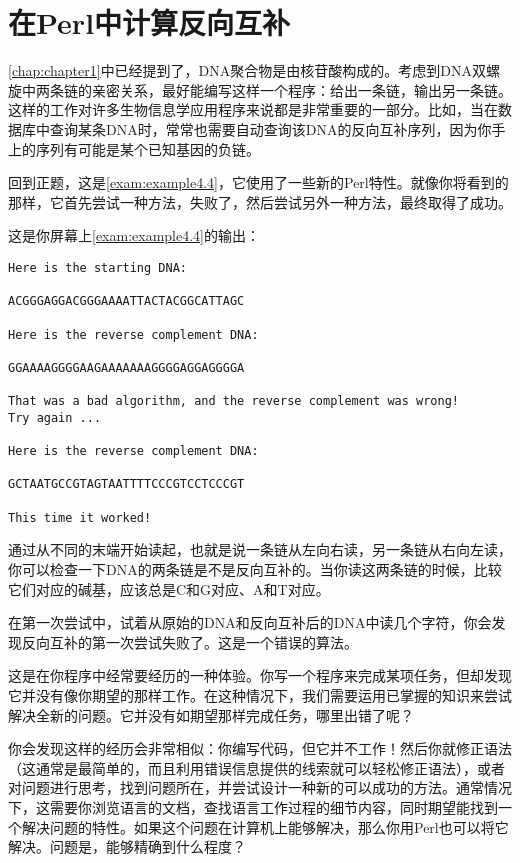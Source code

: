 \section{在Perl中计算反向互补}
\autoref{chap:chapter1}中已经提到了，DNA聚合物是由核苷酸构成的。考虑到DNA双螺旋中两条链的亲密关系，最好能编写这样一个程序：给出一条链，输出另一条链。这样的工作对许多生物信息学应用程序来说都是非常重要的一部分。比如，当在数据库中查询某条DNA时，常常也需要自动查询该DNA的反向互补序列，因为你手上的序列有可能是某个已知基因的负链。

回到正题，这是\autoref{exam:example4.4}，它使用了一些新的Perl特性。就像你将看到的那样，它首先尝试一种方法，失败了，然后尝试另外一种方法，最终取得了成功。



这是你屏幕上\autoref{exam:example4.4}的输出：

\begin{lstlisting}
Here is the starting DNA:

ACGGGAGGACGGGAAAATTACTACGGCATTAGC

Here is the reverse complement DNA:

GGAAAAGGGGAAGAAAAAAAGGGGAGGAGGGGA

That was a bad algorithm, and the reverse complement was wrong!
Try again ...

Here is the reverse complement DNA:

GCTAATGCCGTAGTAATTTTCCCGTCCTCCCGT

This time it worked!
\end{lstlisting}

通过从不同的末端开始读起，也就是说一条链从左向右读，另一条链从右向左读，你可以检查一下DNA的两条链是不是反向互补的。当你读这两条链的时候，比较它们对应的碱基，应该总是C和G对应、A和T对应。

在第一次尝试中，试着从原始的DNA和反向互补后的DNA中读几个字符，你会发现反向互补的第一次尝试失败了。这是一个错误的算法。

这是在你程序中经常要经历的一种体验。你写一个程序来完成某项任务，但却发现它并没有像你期望的那样工作。在这种情况下，我们需要运用已掌握的知识来尝试解决全新的问题。它并没有如期望那样完成任务，哪里出错了呢？

你会发现这样的经历会非常相似：你编写代码，但它并不工作！然后你就修正语法（这通常是最简单的，而且利用错误信息提供的线索就可以轻松修正语法），或者对问题进行思考，找到问题所在，并尝试设计一种新的可以成功的方法。通常情况下，这需要你浏览语言的文档，查找语言工作过程的细节内容，同时期望能找到一个解决问题的特性。如果这个问题在计算机上能够解决，那么你用Perl也可以将它解决。问题是，能够精确到什么程度？

